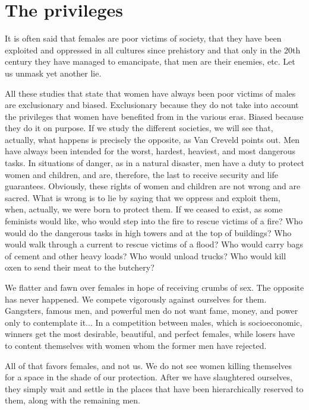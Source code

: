 \section{The privileges}

\par It is often said that females are poor victims of society, that they have been exploited and oppressed in all cultures since prehistory and that only in the 20th century they have managed to emancipate, that men are their enemies, etc. Let us unmask yet another lie.

\par All these studies that state that women have always been poor victims of males are exclusionary and biased. Exclusionary because they do not take into account the privileges that women have benefited from in the various eras. Biased because they do it on purpose. If we study the different societies, we will see that, actually, what happens is precisely the opposite, as Van Creveld points out. Men have always been intended for the worst, hardest, heaviest, and most dangerous tasks. In situations of danger, as in a natural disaster, men have a duty to protect women and children, and are, therefore, the last to receive security and life guarantees. Obviously, these rights of women and children are not wrong and are sacred. What is wrong is to lie by saying that we oppress and exploit them, when, actually, we were born to protect them. If we ceased to exist, as some feminists would like, who would step into the fire to rescue victims of a fire? Who would do the dangerous tasks in high towers and at the top of buildings? Who would walk through a current to rescue victims of a flood? Who would carry bags of cement and other heavy loads? Who would unload trucks? Who would kill oxen to send their meat to the butchery?

\par We flatter and fawn over females in hope of receiving crumbs of sex. The opposite has never happened. We compete vigorously against ourselves for them. Gangsters, famous men, and powerful men do not want fame, money, and power only to contemplate it... In a competition between males, which is socioeconomic, winners get the most desirable, beautiful, and perfect females, while losers have to content themselves with women whom the former men have rejected.

\par All of that favors females, and not us. We do not see women killing themselves for a space in the shade of our protection. After we have slaughtered ourselves, they simply wait and settle in the places that have been hierarchically reserved to them, along with the remaining men.

